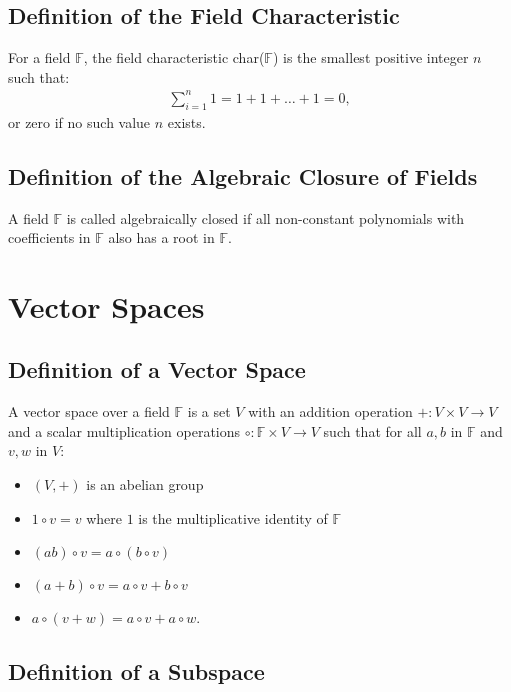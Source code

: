 \documentclass[a4paper, 12pt, twoside]{article}
\begin{document}
\subsection{Definition of the Field Characteristic}

For a field $\mathbb{F}$, the field characteristic  char($\mathbb{F}$) is the 
smallest positive integer $n$ such that: \begin{gather*}
  \sum_{i = 1}^{n} 1 = 1 + 1 + \ldots + 1 = 0,
\end{gather*} or zero if no such value $n$ exists.

\subsection{Definition of the Algebraic Closure of Fields}

A field $\mathbb{F}$ is called algebraically closed if all non-constant polynomials 
with coefficients in $\mathbb{F}$ also has a root in $\mathbb{F}$.

\section{Vector Spaces}

\subsection{Definition of a Vector Space}

A vector space over a field $\mathbb{F}$ is a set $V$ with an addition
operation $+ : V \times V \to V$ and a scalar multiplication operations
$\circ : \mathbb{F} \times V \to V$ such that for all $a, b$ in $\mathbb{F}$
and $v, w$ in $V$: \begin{itemize}
  \item $(V, +)$ is an abelian group
  \item $1 \circ v = v$ where $1$ is the multiplicative identity of $\mathbb{F}$
  \item $(ab) \circ v = a \circ (b \circ v)$
  \item $(a + b) \circ v = a \circ v + b \circ v$
  \item $a \circ (v + w) = a \circ v + a \circ w$.
\end{itemize}

\subsection{Definition of a Subspace}
\end{document}
